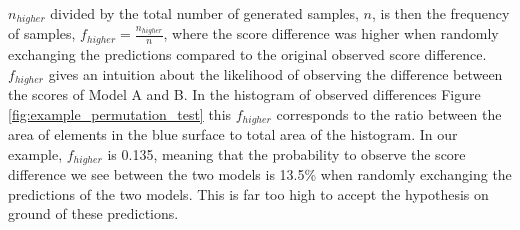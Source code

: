 $n_{higher}$ divided by the total number of generated samples, $n$, is then the frequency of samples, $f_{higher} = \frac{n_{higher}}{n}$, where the score difference was higher when randomly exchanging the predictions compared to the original observed score difference.
$f_{higher}$ gives an intuition about the likelihood of observing the difference between the scores of Model A and B.
In the histogram of observed differences Figure \ref{fig:example_permutation_test} \textbf{} this $f_{higher}$ corresponds to the ratio between the area of elements in the blue surface to total area of the histogram.
In our example, $f_{higher}$ is 0.135, meaning that the probability to observe the score difference we see between the two models is 13.5\% when randomly exchanging the predictions of the two models.
This is far too high to accept the hypothesis on ground of these predictions.

